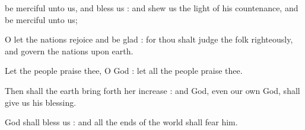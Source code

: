 
 be merciful unto us, and bless us : and shew us the light of his countenance, and be merciful unto us;\par
{}
O let the nations rejoice and be glad : for thou shalt judge the folk righteously, and govern the nations upon earth.\par
{}Let the people praise thee, O God : let all the people praise thee.\par
{}Then shall the earth bring forth her increase : and God, even our own God, shall give us his blessing.\par
{}God shall bless us : and all the ends of the world shall fear him.\par



